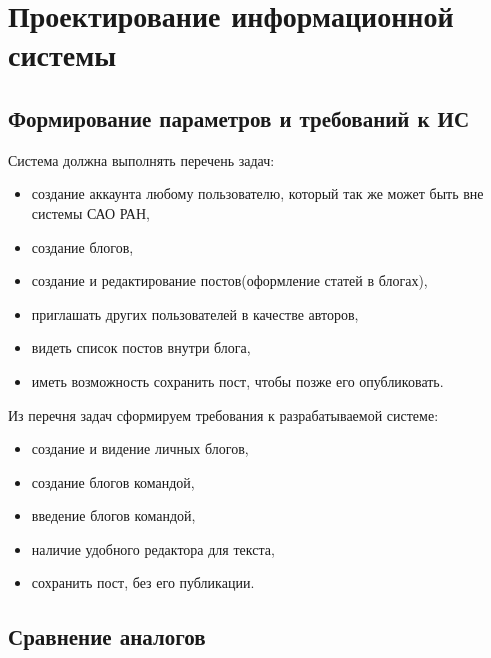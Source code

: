 \section{Проектирование информационной системы}

\subsection{Формирование параметров и требований к ИС}
Система должна выполнять перечень задач:
\begin{itemize}
	\item создание аккаунта любому пользователю, который так же может быть вне системы САО РАН, 
	\item создание блогов,
	\item создание и редактирование постов(оформление статей в блогах),
	\item приглашать других пользователей в качестве авторов,
	\item видеть список постов внутри блога,
	\item иметь возможность сохранить пост, чтобы позже его опубликовать. 
\end{itemize}

Из перечня задач сформируем требования к разрабатываемой системе:
\begin{itemize}
	\item создание и видение личных блогов,
	\item создание блогов командой,
	\item введение блогов командой,
	\item наличие удобного редактора для текста,
	\item сохранить пост, без его публикации. 
\end{itemize}

\subsection{Сравнение аналогов}

\pagebreak